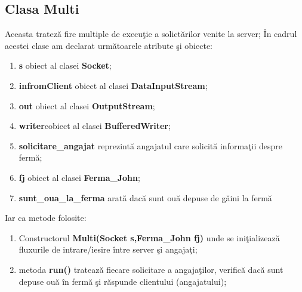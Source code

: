 \documentclass[12pt,a4paper]{article}
\begin{document}
\subsection{Clasa Multi}
	Aceasta tratez\u{a} fire multiple de execu\c{t}ie a solict\u{a}rilor venite la server;
	\^{I}n cadrul acestei clase am declarat urm\u{a}toarele atribute \c{s}i obiecte: 
	\begin{enumerate}
		\item \textbf{s} obiect al clasei \textbf{Socket};
  		\item \textbf{infromClient} obiect al clasei \textbf{DataInputStream};
  		\item \textbf{out} obiect al clasei \textbf{OutputStream};
  		\item \textbf{writer}cobiect al clasei \textbf{BufferedWriter};
  		\item \textbf{solicitare\_angajat} reprezint\u{a} angajatul care solicit\u{a} informa\c{t}ii despre ferm\u{a};
  		\item \textbf{fj} obiect al clasei \textbf{Ferma\_John};
  		\item \textbf{sunt\_oua\_la\_ferma} arat\u{a} dac\u{a} sunt ou\u{a} depuse de g\u{a}ini la ferm\u{a}
	\end{enumerate}
   	Iar ca metode folosite:	
   	\begin{enumerate}
   		\item Constructorul \textbf{Multi(Socket s,Ferma\_John fj)} unde se ini\c{t}ializeaz\u{a} fluxurile de intrare/iesire \^{i}ntre server \c{s}i angaja\c{t}i;
   		\item metoda \textbf{run()} trateaz\u{a} fiecare solicitare a angaja\c{t}ilor, verific\u{a} dac\u{a} sunt depuse ou\u{a} \^{i}n ferm\u{a} \c{s}i r\u{a}spunde clientului (angajatului);
	\end{enumerate} 
\end{document}

